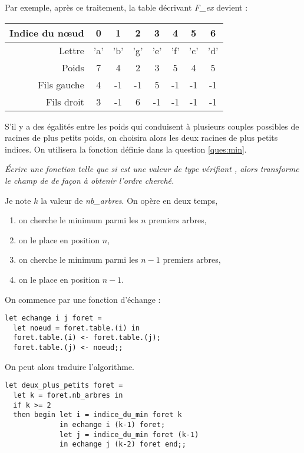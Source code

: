\newpage

Par exemple, après ce traitement, la table décrivant {\it F\_ex} devient :
  \begin{center}
    \begin{tabular}{r|ccccccc}
     Indice du nœud  & 0&1&2&3&4&5&6\\
     \hline
     Lettre  & 'a'&'b'&'g'&'e'&'f'&'c'&'d'\\
     Poids & 7&4&2&3&5&4&5\\
     Fils gauche &4&-1&-1&5&-1&-1&-1\\
     Fils droit &3&-1&6&-1&-1&-1&-1\\
    \end{tabular}
  \end{center}
S’il y a des égalités entre les poids qui conduisent à plusieurs couples possibles de racines de plus petits
poids, on choisira alors les deux racines de plus petits indices. On utilisera la fonction définie dans la
question \ref{ques:min}.
\begin{Exercise}[label = ques:2min]\it
Écrire une fonction  telle que si  est une valeur de type 
vérifiant , alors  transforme le champ  de  de
façon à obtenir l’ordre cherché.
\end{Exercise}
\begin{Answer}
Je note $k$ la valeur de {\it nb\_arbres}. On opère en deux temps, 
\begin{enumerate}
  \item on cherche le minimum parmi les $n$ premiers arbres,
  \item on le place en position $n$,
  \item on cherche le minimum parmi les $n-1$ premiers arbres,
  \item on le place en position $n-1$.  
\end{enumerate}

On commence par une fonction d'échange :

\begin{lstlisting}
let echange i j foret = 
  let noeud = foret.table.(i) in
  foret.table.(i) <- foret.table.(j);
  foret.table.(j) <- noeud;;
\end{lstlisting}

On peut alors traduire l'algorithme.

\begin{lstlisting}
let deux_plus_petits foret = 
  let k = foret.nb_arbres in
  if k >= 2
  then begin let i = indice_du_min foret k     
             in echange i (k-1) foret;
             let j = indice_du_min foret (k-1) 
             in echange j (k-2) foret end;;
\end{lstlisting}

\newpage
\end{Answer}
